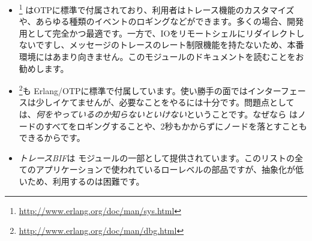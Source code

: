 \begin{itemize}
	\item {}\footnote{\href{http://www.erlang.org/doc/man/sys.html}{http://www.erlang.org/doc/man/sys.html}} はOTPに標準で付属されており、利用者はトレース機能のカスタマイズや、あらゆる種類のイベントのロギングなどができます。多くの場合、開発用として完全かつ最適です。一方で、IOをリモートシェルにリダイレクトしないですし、メッセージのトレースのレート制限機能を持たないため、本番環境にはあまり向きません。このモジュールのドキュメントを読むことをお勧めします。

\item {}\footnote{\href{http://www.erlang.org/doc/man/dbg.html}{http://www.erlang.org/doc/man/dbg.html}}も Erlang/OTPに標準で付属しています。使い勝手の面ではインターフェースは少しイケてませんが、必要なことをやるには十分です。問題点としては、\emph{何をやっているのか知らないといけない}ということです。なぜなら  はノードのすべてをロギングすることや、2秒もかからずにノードを落とすこともできるからです。

	\item \emph{トレースBIF}は モジュールの一部として提供されています。このリストの全てのアプリケーションで使われているローレベルの部品ですが、抽象化が低いため、利用するのは困難です。


\end{itemize}
